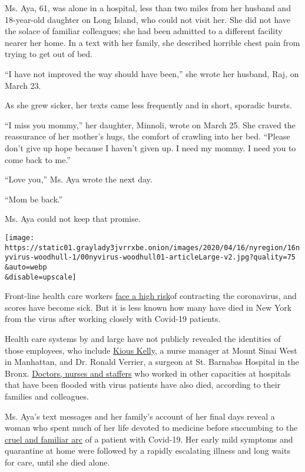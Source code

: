 Ms. Aya, 61, was alone in a hospital, less than two miles from her
husband and 18-year-old daughter on Long Island, who could not visit
her. She did not have the solace of familiar colleagues; she had been
admitted to a different facility nearer her home. In a text with her
family, she described horrible chest pain from trying to get out of bed.

``I have not improved the way should have been,'' she wrote her husband,
Raj, on March 23.

As she grew sicker, her texts came less frequently and in short,
sporadic bursts.

``I miss you mommy,'' her daughter, Minnoli, wrote on March 25. She
craved the reassurance of her mother's hugs, the comfort of crawling
into her bed. ``Please don't give up hope because I haven't given up. I
need my mommy. I need you to come back to me.''

``Love you,'' Ms. Aya wrote the next day.

``Mom be back.''

Ms. Aya could not keep that promise.

\texttt{[image: https://static01.graylady3jvrrxbe.onion/images/2020/04/16/nyregion/16nyvirus-woodhull-1/00nyvirus-woodhull01-articleLarge-v2.jpg?quality=75\\\&auto=webp\\\&disable=upscale]}

Front-line health care workers
\href{https://www.nytimes3xbfgragh.onion/2020/03/30/nyregion/ny-coronavirus-doctors-sick.html}{face
a high risk}of contracting the coronavirus, and scores have become sick.
But it is less known how many have died in New York from the virus after
working closely with Covid-19 patients.

Health care systems by and large have not publicly revealed the
identities of those employees, who include
\href{https://www.nytimes3xbfgragh.onion/2020/03/26/nyregion/nurse-dies-coronavirus-mount-sinai.html}{Kious
Kelly}, a nurse manager at Mount Sinai West in Manhattan, and Dr. Ronald
Verrier, a surgeon at St. Barnabas Hospital in the Bronx.
\href{https://www.nytimes3xbfgragh.onion/2020/04/27/world/americas/health-workers-attacked.html}{Doctors,
nurses and staffers} who worked in other capacities at hospitals that
have been flooded with virus patients have also died, according to their
families and colleagues.

Ms. Aya's text messages and her family's account of her final days
reveal a woman who spent much of her life devoted to medicine before
succumbing to the
\href{https://www.nytimes3xbfgragh.onion/2020/04/13/nyregion/coronavirus-nyc-doctors.html}{cruel
and familiar arc} of a patient with Covid-19. Her early mild symptoms
and quarantine at home were followed by a rapidly escalating illness and
long waits for care, until she died alone.

